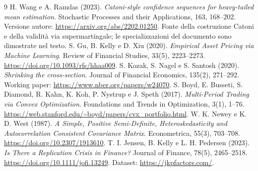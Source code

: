 \documentclass[11pt,a4paper]{article}
\theoremstyle{definition}\newtheorem{definition}[theorem]{Definizione}
\theoremstyle{remark}\newtheorem{remark}[theorem]{Osservazione}
\begin{document}
\begin{thebibliography}{9}
 H. Wang e A. Ramdas (2023). \emph{Catoni-style confidence sequences for heavy-tailed mean estimation}. Stochastic Processes and their Applications, 163, 168--202. Versione autore: \url{https://arxiv.org/abs/2202.01250}. Fonte della costruzione Catoni e della validità via supermartingale; le specializzazioni del documento sono dimostrate nel testo.
 S. Gu, B. Kelly e D. Xiu (2020). \emph{Empirical Asset Pricing via Machine Learning}. Review of Financial Studies, 33(5), 2223--2273. \url{https://doi.org/10.1093/rfs/hhaa009}.
 S. Kozak, S. Nagel e S. Santosh (2020). \emph{Shrinking the cross-section}. Journal of Financial Economics, 135(2), 271--292. Working paper: \url{https://www.nber.org/papers/w24070}.
 S. Boyd, E. Busseti, S. Diamond, R. Kahn, K. Koh, P. Nystrup e J. Speth (2017). \emph{Multi-Period Trading via Convex Optimization}. Foundations and Trends in Optimization, 3(1), 1--76. \url{https://web.stanford.edu/~boyd/papers/cvx_portfolio.html}.
 W. K. Newey e K. D. West (1987). \emph{A Simple, Positive Semi-Definite, Heteroskedasticity and Autocorrelation Consistent Covariance Matrix}. Econometrica, 55(3), 703--708. \url{https://doi.org/10.2307/1913610}.
 T. I. Jensen, B. Kelly e L. H. Pedersen (2023). \emph{Is There a Replication Crisis in Finance?} Journal of Finance, 78(5), 2465--2518. \url{https://doi.org/10.1111/jofi.13249}. Dataset: \url{https://jkpfactors.com/}.
\end{thebibliography}
\end{document}

